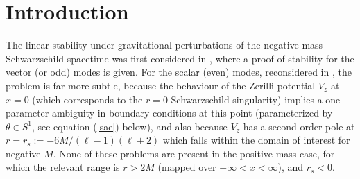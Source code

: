 \documentclass[aps,floats,showpacs,amssymb,tightenlines]{revtex4}
\begin{document}
\maketitle

\section{Introduction}
The linear stability under gravitational perturbations of the negative mass Schwarzschild
spacetime was first considered in \cite{ghi}, where a proof of stability for the
vector (or odd) modes is given. For the scalar (even) modes, reconsidered in \cite{dg},  the problem is far more subtle,
because the behaviour of the Zerilli potential $V_z$ \cite{zerilli,ki} at $x=0$ (which corresponds to
the $r=0$ Schwarzschild singularity) implies
a one parameter ambiguity \cite{ghi} in boundary conditions at this point (parameterized by $\theta \in S^1$,
 see equation 
(\ref{sae}) below), and
  also because   $V_z$ has 
a second order pole at $r=r_s:=-6M/(\ell-1)(\ell+2)$  which  falls within the domain of interest 
for negative $M$. None of these problems
are present in the positive mass case, for which the relevant range is
$r > 2M$ (mapped over $-\infty < x < \infty$),  and $r_s <0$.
\end{document}
